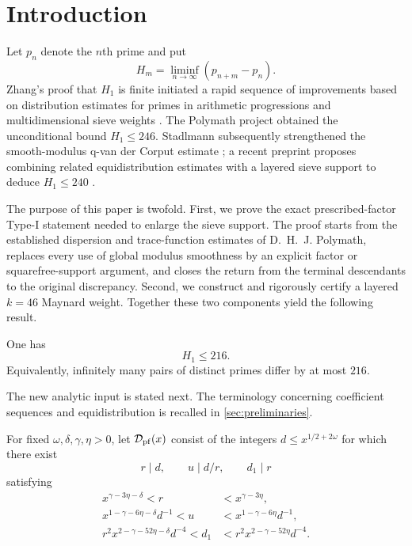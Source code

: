 \section{Introduction}

Let $p_n$ denote the $n$th prime and put
\[
 H_m=\liminf_{n\to\infty}(p_{n+m}-p_n).
\]
Zhang's proof that $H_1$ is finite initiated a rapid sequence of
improvements based on distribution estimates for primes in arithmetic
progressions and multidimensional sieve weights
\cite{Zhang2014,Maynard2015,PolymathEDZ2014,PolymathSieve2014}.
The Polymath project obtained the unconditional bound $H_1\le246$.
Stadlmann subsequently strengthened the smooth-modulus q-van der Corput
estimate \cite{Stadlmann2025}; a recent preprint proposes combining related
equidistribution estimates with a layered sieve support to deduce
$H_1\le240$ \cite{Stadlmann2026}.

The purpose of this paper is twofold.  First, we prove the exact
prescribed-factor Type-I statement needed to enlarge the sieve support.  The
proof starts from the established dispersion and trace-function estimates of
D.~H.~J. Polymath, replaces every use of global modulus smoothness by an
explicit factor or squarefree-support argument, and closes the return from
the terminal descendants to the original discrepancy.  Second, we construct
and rigorously certify a layered $k=46$ Maynard weight.  Together these two
components yield the following result.

\begin{theorem}\label{thm:main}
One has
\[
 \boxed{H_1\le216.}
\]
Equivalently, infinitely many pairs of distinct primes differ by at most
$216$.
\end{theorem}

The new analytic input is stated next.  The terminology concerning
coefficient sequences and equidistribution is recalled in
\cref{sec:preliminaries}.

\begin{definition}\label{def:S52-family}
For fixed $\omega,\delta,\gamma,\eta>0$, let $\mathcal D_{\mathrm{pf}}(x)$ consist of the
integers $d\le x^{1/2+2\omega}$ for which there exist
\[
 r\mid d,\qquad u\mid d/r,\qquad d_1\mid r
\]
satisfying
\begin{align}
 x^{\gamma-3\eta-\delta}<r&<x^{\gamma-3\eta},\label{eq:S52-r}\\
 x^{1-\gamma-6\eta-\delta}d^{-1}<u
 &<x^{1-\gamma-6\eta}d^{-1},\label{eq:S52-u}\\
 r^2x^{2-\gamma-52\eta-\delta}d^{-4}<d_1
 &<r^2x^{2-\gamma-52\eta}d^{-4}.
 \label{eq:S52-d1}
\end{align}
\end{definition}

